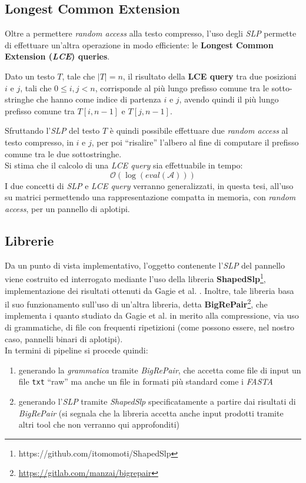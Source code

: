 \subsection{Longest Common Extension}
Oltre a permettere \textit{random access} alla testo compresso, 
l'uso degli \textit{SLP} permette di effettuare 
un'altra operazione in modo efficiente: le \textbf{Longest Common Extension
  (\textit{LCE}) queries}.
\begin{definizione}
  Dato un testo $T$, tale che $|T|=n$, il risultato della \textbf{LCE query} tra
  due posizioni $i$ e $j$, tali che $0\leq i,j<n$, corrisponde al più lungo
  prefisso comune tra le sotto-stringhe che hanno come indice di partenza $i$ e
  $j$, avendo quindi il più lungo prefisso comune tra $T[i,n-1]$ e $T[j,n-1]$.
\end{definizione}
Sfruttando l'\textit{SLP} del testo $T$ è quindi possibile effettuare due
\textit{random access} al testo compresso, in $i$ e $j$, per poi ``risalire''
l'albero al fine di computare il prefisso comune tra le due sottostringhe.\\
Si stima che il calcolo di una \textit{LCE query} sia effettuabile in tempo:
\begin{equation}
  \label{eq:lcetime}
  \mathcal{O}\left(\log (eval(\mathcal{A}))\right)
\end{equation}
I due concetti di \textit{SLP} e \textit{LCE query} verranno generalizzati, in
questa tesi, all'uso su matrici permettendo una rappresentazione compatta in
memoria, con \textit{random access}, per un pannello di aplotipi.
\subsection{Librerie}
Da un punto di vista implementativo, l'oggetto contenente l'\textit{SLP} del
pannello viene costruito ed interrogato mediante l'uso della libreria
\textbf{ShapedSlp}\footnote{https://github.com/itomomoti/ShapedSlp},
implementazione dei risultati ottenuti da 
Gagie et al. \cite{slpgagie}. Inoltre, tale libreria basa il suo funzionamento
sull'uso di un'altra libreria, detta
\textbf{BigRePair}\footnote{\url{https://gitlab.com/manzai/bigrepair}}, che 
implementa i quanto studiato da Gagie et al. \cite{rpair} in merito alla
compressione, via uso di grammatiche, di file con frequenti ripetizioni (come
possono essere, nel nostro caso, pannelli binari di aplotipi).\\
In termini di pipeline si procede quindi:
\begin{enumerate}
  \item generando la \textit{grammatica} tramite \textit{BigRePair}, che accetta
  come file di input un file \texttt{txt} ``raw'' ma anche un file in formati
  più standard come i \textit{FASTA}
  \item generando l'\textit{SLP} tramite \textit{ShapedSlp} specificatamente a
  partire dai risultati di \textit{BigRePair} (si segnala che la libreria
  accetta anche input prodotti tramite altri tool che non verranno qui
  approfonditi) 
\end{enumerate}